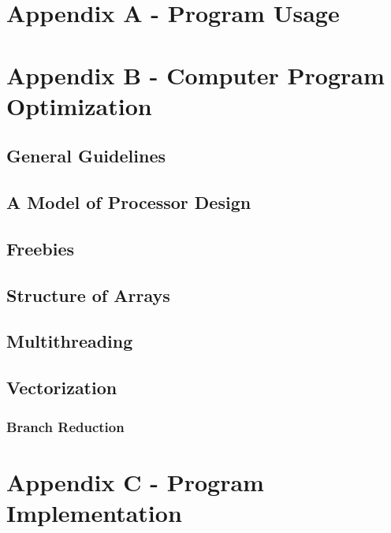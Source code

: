 \documentclass[12pt]{article}
\begin{document}
\section{Appendix A - Program Usage}

\section{Appendix B - Computer Program Optimization}

\subsection{General Guidelines}

\subsection{A Model of Processor Design}

\subsection{Freebies}

\subsection{Structure of Arrays}

\subsection{Multithreading}

\subsection{Vectorization}
\subsubsection{Branch Reduction}



\section{Appendix C - Program Implementation}
\end{document}
